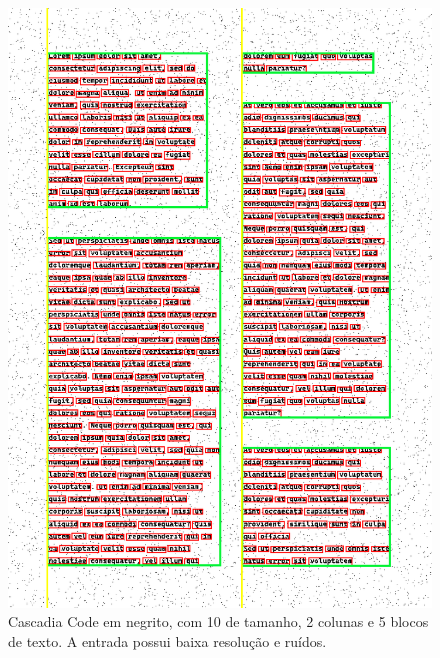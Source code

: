\documentclass[english, 
               brazil, 
               bsc] %
               {dcomp-abntex2}
\begin{document}
\begin{figure}[h]
        \caption{\label{cascadia} \small Cascadia Code em negrito, com 10 de tamanho, 2 colunas e 5 blocos de texto. A entrada possui baixa resolução e ruídos. }
        \begin{center}
            \includegraphics[scale=0.55]{./images/cascadia_code_10_detected_colunas_2_blocos_5_linhas_42_palavras_395.png}
        \end{center}
\end{figure}
\end{document}

